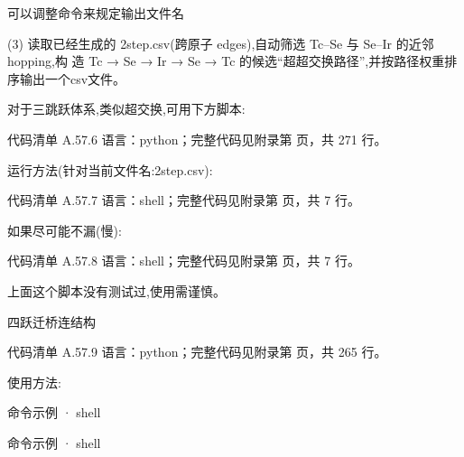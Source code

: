 \documentclass[lang=cn,scheme=chinese,color=blue,device=normal,toc=onecol,math=cm]{elegantbook}
\begin{document}
可以调整命令来规定输出文件名\par


(3) 读取已经生成的 2step.csv(跨原子 edges),自动筛选 Tc–Se 与 Se–Ir 的近邻 hopping,构 造 Tc → Se → Ir → Se → Tc 的候选“超超交换路径”,并按路径权重排序输出一个csv文件。\par


对于三跳跃体系,类似超交换,可用下方脚本:\par


\begin{codeindexbox}{代码清单 A.57.6}
语言：python；完整代码见附录第 \pageref{code:57:6} 页，共 271 行。
\end{codeindexbox}


运行方法(针对当前文件名:2step.csv):\par


\begin{codeindexbox}{代码清单 A.57.7}
语言：shell；完整代码见附录第 \pageref{code:57:7} 页，共 7 行。
\end{codeindexbox}


如果尽可能不漏(慢):\par


\begin{codeindexbox}{代码清单 A.57.8}
语言：shell；完整代码见附录第 \pageref{code:57:8} 页，共 7 行。
\end{codeindexbox}


上面这个脚本没有测试过,使用需谨慎。\par


四跃迁桥连结构\par


\begin{codeindexbox}{代码清单 A.57.9}
语言：python；完整代码见附录第 \pageref{code:57:9} 页，共 265 行。
\end{codeindexbox}


使用方法:\par


\begin{inlinecodebox}{命令示例 · shell}
\end{inlinecodebox}


\begin{inlinecodebox}{命令示例 · shell}
\end{inlinecodebox}
\end{document}
